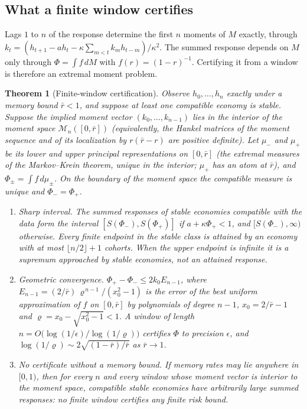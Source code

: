 \documentclass[12pt]{article}
\newtheorem{theorem}{Theorem}[section]
\theoremstyle{definition}
\theoremstyle{remark}
\begin{document}
\subsection{What a finite window certifies}

Lags $1$ to $n$ of the response determine the first $n$ moments of $M$ exactly, through $k_t=(h_{t+1}-ah_t-\kappa\sum_{m<t}k_mh_{t-m})/\kappa^2$. The summed response depends on $M$ only through $\Phi=\int f\,dM$ with $f(r)=(1-r)^{-1}$. Certifying it from a window is therefore an extremal moment problem.

\begin{theorem}[Finite-window certification]\label{thm:window}
Observe $h_0,\ldots,h_n$ exactly under a memory bound $\bar r<1$, and suppose at least one compatible economy is stable. Suppose the implied moment vector $(k_0,\ldots,k_{n-1})$ lies in the interior of the moment space $\mathcal M_n([0,\bar r])$ (equivalently, the Hankel matrices of the moment sequence and of its localization by $r(\bar r-r)$ are positive definite). Let $\mu_-$ and $\mu_+$ be its lower and upper principal representations on $[0,\bar r]$ (the extremal measures of the Markov--Krein theorem, unique in the interior; $\mu_+$ has an atom at $\bar r$), and $\Phi_\pm=\int f\,d\mu_\pm$. On the boundary of the moment space the compatible measure is unique and $\Phi_-=\Phi_+$.
\begin{enumerate}[label=(\roman*)]
\item \emph{Sharp interval.} The summed responses of stable economies compatible with the data form the interval $[S(\Phi_-),S(\Phi_+)]$ if $a+\kappa\Phi_+<1$, and $[S(\Phi_-),\infty)$ otherwise. Every finite endpoint in the stable class is attained by an economy with at most $\lfloor n/2\rfloor+1$ cohorts. When the upper endpoint is infinite it is a supremum approached by stable economies, not an attained response.
\item \emph{Geometric convergence.} $\Phi_+-\Phi_-\le2k_0E_{n-1}$, where $E_{n-1}=(2/\bar r)\,\varrho^{\,n-1}/(x_0^2-1)$ is the error of the best uniform approximation of $f$ on $[0,\bar r]$ by polynomials of degree $n-1$, $x_0=2/\bar r-1$ and $\varrho=x_0-\sqrt{x_0^2-1}<1$. A window of length $n=O\bigl(\log(1/\epsilon)/\log(1/\varrho)\bigr)$ certifies $\Phi$ to precision $\epsilon$, and $\log(1/\varrho)\sim2\sqrt{(1-\bar r)/\bar r}$ as $\bar r\to1$.
\item \emph{No certificate without a memory bound.} If memory rates may lie anywhere in $[0,1)$, then for every $n$ and every window whose moment vector is interior to the moment space, compatible stable economies have arbitrarily large summed responses: no finite window certifies any finite risk bound.
\end{enumerate}
\end{theorem}
\end{document}
